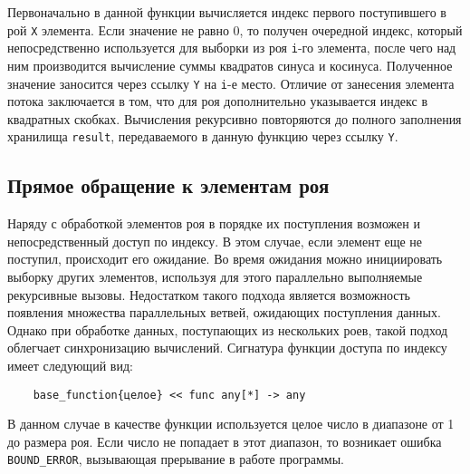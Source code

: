 Первоначально в данной функции вычисляется индекс первого поступившего в рой \texttt{X} элемента. Если значение не равно 0, то получен очередной индекс, который непосредственно используется для выборки из роя \texttt{i}-го элемента, после чего над ним производится вычисление суммы квадратов синуса и косинуса. Полученное значение заносится через ссылку \texttt{Y} на \texttt{i}-е место. Отличие от занесения элемента потока заключается в том, что для роя дополнительно указывается индекс в квадратных скобках. Вычисления рекурсивно повторяются до полного заполнения хранилища \texttt{result}, передаваемого в данную функцию через ссылку \texttt{Y}.


\subsection{Прямое обращение к элементам роя}

Наряду с обработкой элементов роя в порядке их поступления возможен и непосредственный доступ по индексу. В этом случае, если элемент еще не поступил, происходит его ожидание. Во время ожидания можно инициировать выборку других элементов, используя для этого параллельно выполняемые рекурсивные вызовы. Недостатком такого подхода является возможность появления множества параллельных ветвей, ожидающих поступления данных. Однако при обработке данных, поступающих из нескольких роев, такой подход облегчает синхронизацию вычислений. Сигнатура функции доступа по индексу имеет следующий вид:
\begin{verbatim}
    base_function{целое} << func any[*] -> any
\end{verbatim}
В данном случае в качестве функции используется целое число в диапазоне от 1 до размера роя. Если число не попадает в этот диапазон, то возникает ошибка \verb|BOUND_ERROR|, вызывающая прерывание в работе программы.

